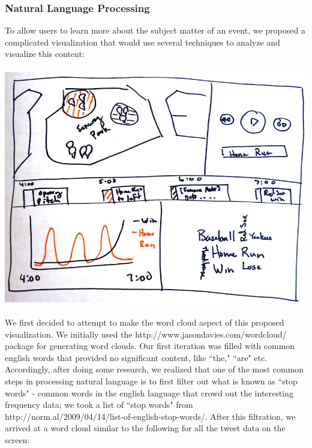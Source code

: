 \documentclass[pdftex,12pt,a4paper]{article}
\begin{document}
\subsubsection{Natural Language Processing}
To allow users to learn more about the subject matter of an event, we proposed a complicated visualization that would use several techniques to analyze and visualize this content: \\ \\
\includegraphics[width=5.5in]{pheme2.jpg} \\ \\
We first decided to attempt to make the word cloud aspect of this proposed visualization. We initially used the http://www.jasondavies.com/wordcloud/ package for generating word clouds. Our first iteration was filled with common english words that provided no significant content, like ``the," ``are" etc. Accordingly, after doing some research, we realized that one of the most common steps in processing natural language is to first filter out what is known as ``stop words" - common words in the english language that crowd out the interesting frequency data; we took a list of ``stop words" from  http://norm.al/2009/04/14/list-of-english-stop-words/. After this filtration, we arrived at a word cloud similar to the following for all the tweet data on the screen: \\ \\
\end{document}

